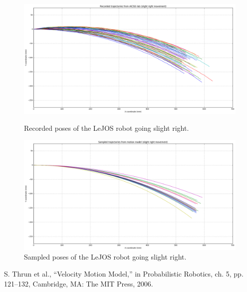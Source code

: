 \documentclass[paper=a4, fontsize=11pt]{scrartcl} %
\begin{document}
    \begin{figure}[H]
        \centering
        \begin{minipage}{\textwidth}
            \centering
            \includegraphics[width=1\textwidth]{images/recorded_poses_slight_right.png} %
            \caption{Recorded poses of the LeJOS robot going slight right.}
        \end{minipage}\hfill
        \begin{minipage}{\textwidth}
            \centering
            \includegraphics[width=1\textwidth]{images/sampled_poses_slightRight.png} %
            \caption{Sampled poses of the LeJOS robot going slight right.}
        \end{minipage}
    \end{figure}

\begin{thebibliography}{9}
    S. Thrun et al., “Velocity Motion Model,” in Probabilistic Robotics, ch. 5, pp. 121–132, Cambridge,
    MA: The MIT Press, 2006.
\end{thebibliography}
\end{document}
